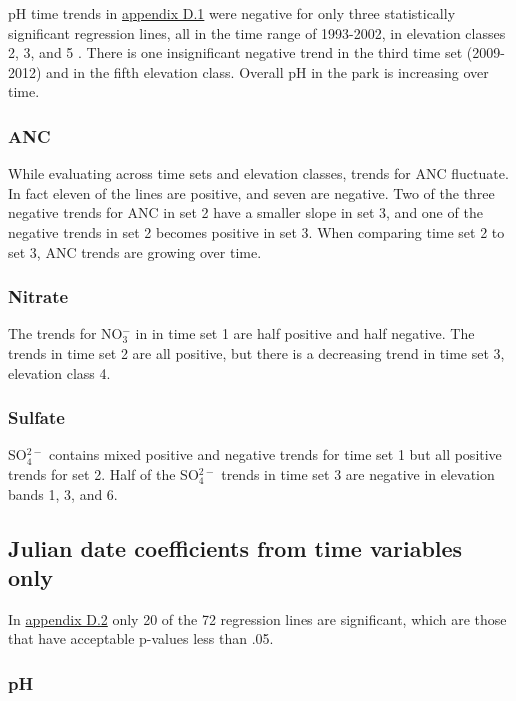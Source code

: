 pH time trends in \hyperref[app:Step-wise Julian date]{appendix D.1} were negative for only three statistically significant regression lines, all in the time range of 1993-2002, in elevation classes 2, 3, and 5 .   
There is one insignificant negative trend in the third time set (2009-2012) and in the fifth elevation class.   
Overall pH in the park is increasing over time.

\subsubsection{ANC}

While evaluating across time sets and elevation classes, trends for ANC fluctuate.
In fact eleven of the lines are positive, and seven are negative.   
Two of the three negative trends for ANC in set 2 have a smaller slope in set 3, and one of the negative trends in set 2 becomes positive in set 3.  
When comparing time set 2 to set 3, ANC trends are growing over time. 

\subsubsection{Nitrate}

The trends for NO$_3^-$ in in time set 1 are half positive and half negative.
The trends in time set 2 are all positive, but there is a decreasing trend in time set 3, elevation class 4. 

\subsubsection{Sulfate}

SO$_4^{2-}$ contains mixed positive and negative trends for time set 1 but all positive trends for set 2. 
Half of the SO$_4^{2-}$ trends in time set 3 are negative in elevation bands 1, 3, and 6.

\subsection{Julian date coefficients from time variables only}

In \hyperref[app:time vars]{appendix D.2} only 20 of the 72 regression lines are significant,  which are those that have acceptable p-values less than .05.

\subsubsection{pH}

